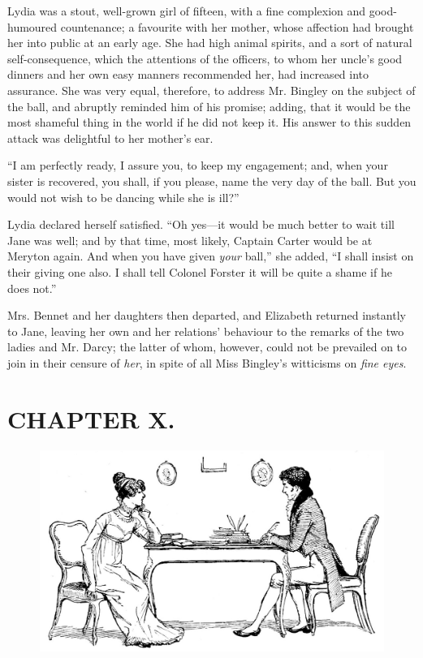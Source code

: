 Lydia was a stout, well-grown girl of fifteen, with a fine complexion and good-humoured countenance; a favourite with her mother, whose affection had brought her into public at an early age. She had high animal spirits, and a sort of natural self-consequence, which the attentions of the officers, to whom her uncle's good dinners and her own easy manners recommended her, had increased into assurance. She was very equal, therefore, to address Mr. Bingley on the subject of the ball, and abruptly reminded him of his promise; adding, that it would be the most shameful thing in the world if he did not keep it. His answer to this sudden attack was delightful to her mother's ear.

``I am perfectly ready, I assure you, to keep my engagement; and, when your sister is recovered, you shall, if you please, name the very day of the ball. But you would not wish to be dancing while she is ill?''

Lydia declared herself satisfied. ``Oh yes---it would be much better to wait till Jane was well; and by that time, most likely, Captain Carter would be at Meryton again. And when you have given \textit{your} ball,'' she added, ``I shall insist on their giving one also. I shall tell Colonel Forster it will be quite a shame if he does not.''

Mrs. Bennet and her daughters then departed, and Elizabeth returned instantly to Jane, leaving her own and her relations' behaviour to the remarks of the two ladies and Mr. Darcy; the latter of whom, however, could not be prevailed on to join in their censure of \textit{her}, in spite of all Miss Bingley's witticisms on \textit{fine eyes}.


\chapter{CHAPTER X.}

\begin{figure}[htbp]
    \centering
    \includegraphics[width=\textwidth]{illustrations/i_089_a.jpg}
\end{figure}


